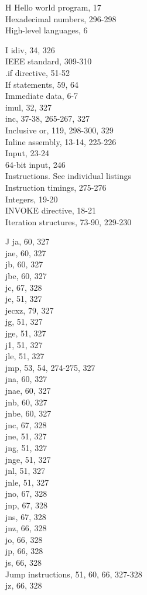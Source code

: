\documentclass[10pt]{book}
\begin{document}
H
Hello world program, 17\\
Hexadecimal numbers, 296-298\\
High-level languages, 6

I
idiv, 34, 326\\
IEEE standard, 309-310\\
.if directive, 51-52\\
If statements, 59, 64\\
Immediate data, 6-7\\
imul, 32, 327\\
inc, 37-38, 265-267, 327\\
Inclusive or, 119, 298-300, 329\\
Inline assembly, 13-14, 225-226\\
Input, 23-24\\
64-bit input, 246\\
Instructions. See individual listings\\
Instruction timings, 275-276\\
Integers, 19-20\\
INVOKE directive, 18-21\\
Iteration structures, 73-90, 229-230

J
ja, 60, 327\\
jae, 60, 327\\
jb, 60, 327\\
jbe, 60, 327\\
jc, 67, 328\\
je, 51, 327\\
jecxz, 79, 327\\
jg, 51, 327\\
jge, 51, 327\\
j1, 51, 327\\
jle, 51, 327\\
jmp, 53, 54, 274-275, 327\\
jna, 60, 327\\
jnae, 60, 327\\
jnb, 60, 327\\
jnbe, 60, 327\\
jnc, 67, 328\\
jne, 51, 327\\
jng, 51, 327\\
jnge, 51, 327\\
jnl, 51, 327\\
jnle, 51, 327\\
jno, 67, 328\\
jnp, 67, 328\\
jns, 67, 328\\
jnz, 66, 328\\
jo, 66, 328\\
jp, 66, 328\\
js, 66, 328\\
Jump instructions, 51, 60, 66, 327-328\\
jz, 66, 328
\end{document}
